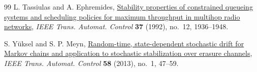 \documentclass[11pt]{article}
\begin{document}
\begin{thebibliography}{99}
L. Tassiulas and A. Ephremides,
\href{https://doi.org/10.1109/9.182479}
{Stability properties of constrained queueing systems and scheduling
policies for maximum throughput in multihop radio networks},
\emph{IEEE Trans. Automat. Control}
\textbf{37} (1992), no.~12, 1936--1948.

S. Y\"uksel and S. P. Meyn,
\href{https://doi.org/10.1109/TAC.2012.2204157}
{Random-time, state-dependent stochastic drift for Markov chains and
application to stochastic stabilization over erasure channels},
\emph{IEEE Trans. Automat. Control}
\textbf{58} (2013), no.~1, 47--59.

\end{thebibliography}
\end{document}
